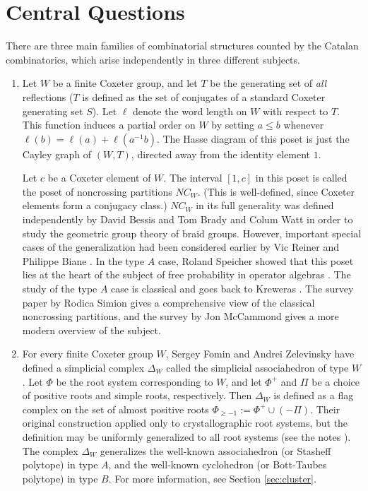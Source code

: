 \documentclass[12pt,letterpaper, reqno]{amsart}
\begin{document}

\section{Central Questions}
\label{sec:central}

There are three main families of combinatorial structures counted by
the Catalan combinatorics, which arise independently in three different
subjects.

\begin{enumerate}
\item Let $W$ be a finite Coxeter group, and let $T$ be the generating
set of {\em all} reflections ($T$ is defined as the set of conjugates of
a standard Coxeter generating set $S$). Let $\ell$ denote the word length
on $W$ with respect to $T$. This function induces a partial order on $W$
by setting $a\leq b$ whenever $\ell(b)=\ell(a)+\ell(a^{-1}b)$. The Hasse
diagram of this poset is just the Cayley graph of $(W,T)$, directed away
from the identity element $1$.

Let $c$ be a Coxeter element of $W$. The interval $[1,c]$ in
this poset is called the poset of {\sf noncrossing partitions}
$NC_W$. (This is well-defined, since Coxeter elements form a conjugacy
class.) $NC_W$ in its full generality was defined independently
by David Bessis \cite{bessis:dual} and Tom Brady and Colum Watt
\cite{brady,brady-watt:kpi1} in order to study the geometric group theory
of braid groups. However, important special cases of the generalization
had been considered earlier by Vic Reiner \cite{reiner} and Philippe Biane
\cite{biane}. In the type $A$ case, Roland Speicher showed that this poset
lies at the heart of the subject of free probability in operator algebras
\cite{speicher:survey}. The study of the type $A$ case is classical and
goes back to Kreweras \cite{kreweras}. The survey paper \cite{simion}
by Rodica Simion gives a comprehensive view of the classical noncrossing
partitions, and the survey \cite{mccammond:noncrossing} by Jon McCammond
gives a more modern overview of the subject.

\item For every finite Coxeter group $W$, Sergey Fomin and Andrei
Zelevinsky have defined a simplicial complex $\Delta_W$ called the
{\sf simplicial associahedron} of type $W$. Let $\Phi$ be the root
system corresponding to $W$, and let $\Phi^+$ and $\Pi$ be a choice
of positive roots and simple roots, respectively. Then $\Delta_W$ is
defined as a flag complex on the set of {\sf almost positive roots}
$\Phi_{\geq -1}:= \Phi^+ \cup (-\Pi)$. Their original construction
\cite{fomin-zelevinsky:ysystems} applied only to crystallographic
root systems, but the definition may be uniformly generalized to all
root systems (see the notes \cite{fomin-reading:survey}). The complex
$\Delta_W$ generalizes the well-known associahedron (or Stasheff polytope)
in type $A$, and the well-known cyclohedron (or Bott-Taubes polytope)
in type $B$. For more information, see Section \ref{sec:cluster}.


\end{enumerate}
\end{document}
